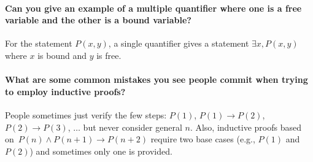 \documentclass[10pt,english]{article}
\begin{document}
\paragraph{Can you give an example of a multiple quantifier where one is a free variable and the other is a bound variable?}

For the statement $P(x,y)$, a single quantifier gives a statement $\exists x, P(x,y)$ where $x$ is bound and $y$ is free.

\paragraph{What are some common mistakes you see people commit when trying to employ inductive proofs?}

People sometimes just verify the few steps: $P(1)$, $P(1) \to P(2)$, $P(2) \to P(3)$, $\ldots$ but never consider general $n$.  Also, inductive proofs based on $P(n) \wedge P(n+1) \to P(n+2)$ require two base cases (e.g.,  $P(1)$ and $P(2)$) and sometimes only one is provided.
\end{document}
